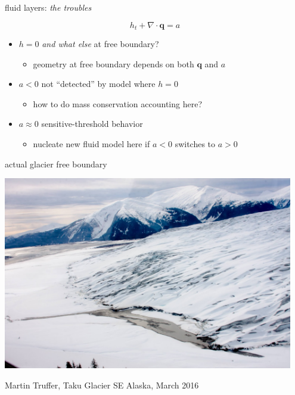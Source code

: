 \documentclass[xcolor={dvipsnames}]{beamer}
\newcommand\bq{\mathbf{q}}
\newcommand\Div{\nabla\cdot}
\begin{document}
\begin{frame}{fluid layers: \emph{the troubles}}

\vspace{-1.2mm}

\begin{center}
\end{center}

\vspace{-16mm}
$$h_t + \Div\bq = a$$

  \begin{itemize}
  \item<1-> $h=0$ \emph{and what else} at \alert<1>{free boundary}?
     \begin{itemize}
     \item<1->[$\circ$] geometry at free boundary depends on both $\bq$ and $a$
     \end{itemize}
  \item<2-> $a<0$ not ``detected'' by model where $h=0$
     \begin{itemize}
     \item<2->[$\circ$] how to do mass conservation accounting \alert<2>{here}?
     \end{itemize}
  \item<3> $a\approx 0$ sensitive-threshold behavior
     \begin{itemize}
     \item<3>[$\circ$] nucleate new fluid model \alert<3>{here} if $a<0$ switches to $a>0$
     \end{itemize}
  \end{itemize}
\end{frame}


\begin{frame}{actual glacier free boundary}

\begin{center}
\includegraphics[width=0.95\textwidth,keepaspectratio=true]{truffertaku2016}
\end{center}

\tiny \hfill Martin Truffer, Taku Glacier SE Alaska, March 2016
\end{frame}
\end{document}
